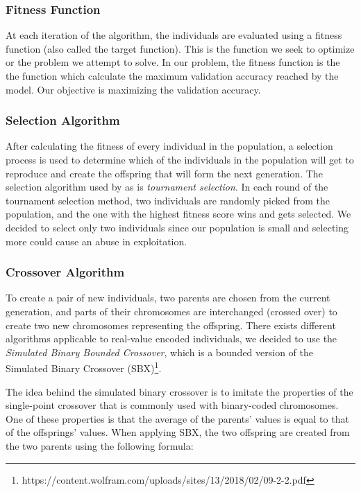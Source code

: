 \subsubsection{Fitness Function}
At each iteration of the algorithm, the individuals are evaluated using a fitness function (also called the target function). This is the function we seek to optimize or the problem we attempt to solve.
In our problem, the fitness function is the the function which calculate the maximum validation accuracy reached by the model. Our objective is maximizing the validation accuracy.

\subsubsection{Selection Algorithm}
After calculating the fitness of every individual in the population, a selection process is used to determine which of the individuals in the population will get to reproduce and create the offspring that will form the next generation.
The selection algorithm used by as is \textit{tournament selection}. In each round of the tournament selection method, two individuals are randomly picked from the population, and the one with the highest fitness score wins and gets selected. We decided to select only two individuals since our population is small and selecting more could cause an abuse in exploitation.

\subsubsection{Crossover Algorithm}
To create a pair of new individuals, two parents are chosen from the current generation, and parts of their chromosomes are interchanged (crossed over) to create two new chromosomes representing the offspring. There exists different algorithms applicable to real-value encoded individuals, we decided to use the \textit{Simulated Binary Bounded Crossover}, which is a bounded version of the Simulated Binary Crossover (SBX)\footnote{https://content.wolfram.com/uploads/sites/13/2018/02/09-2-2.pdf}.

The idea behind the simulated binary crossover is to imitate the properties of the single-point crossover that is commonly used with binary-coded chromosomes. One of these properties is that the average of the parents' values is equal to that of the offsprings' values.
When applying SBX, the two offspring are created from the two parents using the following formula:

